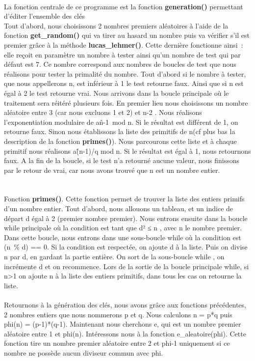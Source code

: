 \documentclass[11pt,fleqn]{book} %
\begin{document}
\paragraph{}La fonction centrale de ce programme est la fonction \textbf{generation()} permettant d'éditer l'ensemble des clés
\\Tout d'abord, nous choisissons 2 nombres premiers aléatoires à l'aide de la fonction \textbf{get\_random()} qui va tirer au hasard un nombre puis va vérifier s'il est premier grâce à la méthode \textbf{lucas\_lehmer()}.
Cette dernière fonctionne ainsi : elle reçoit en paramètre un nombre à tester ainsi qu'un nombre de test qui par défaut est 7. Ce nombre correspond aux nombres de boucles de test que nous réalisons pour tester la primalité du nombre. Tout d'abord si le nombre à tester, que nous appellerons n, est inférieur à 1 le test retourne faux. Ainsi que si n est égal à 2 le test retourne vrai. Nous arrivons dans la boucle principale où le traitement sera réitéré plusieurs fois. En premier lieu nous choisissons un nombre aléatoire entre 3 (car nous excluons 1 et 2) et n-2 . Nous réalisons l’exponentiation modulaire de a\^n-1 mod n. Si le résultat est différent de 1,  on retourne faux. Sinon nous établissons la liste des primitifs de n(cf plus bas la description de la fonction \textbf{primes()}). Nous parcourons cette liste et à chaque primitif nous réalisons a\^(n-1)/q mod n. Si le résultat est égal à 1, nous retournons faux. A la fin de la boucle, si le test n'a retourné aucune valeur, nous finissons par le retour de vrai, car nous avons trouvé que n est un nombre entier.
\\\\\\Fonction \textbf{primes()}. Cette fonction permet de trouver la liste des entiers primifs d'un nombre entier. Tout d'abord, nous allouons un tableau, et un indice de départ d égal à 2 (premier nombre premier). Nous entrons ensuite dans la boucle while principale où la condition est tant que d² ≤ n , avec n le nombre premier. Dans cette boucle, nous entrons dans une sous-boucle while  où la condition est (n \% d) == 0. Si la condition est respectée, on ajoute d à la liste. Puis on divise n par d, en gardant la partie entière. On sort de la sous-boucle while , on incrémente d et on recommence. Lors de la sortie de la boucle principale while, si n>1 on ajoute n à la liste des entiers primitifs, dans tous les cas on retourne la liste.
\\\\Retournons à la génération des clés, nous avons grâce aux fonctions précédentes, 2 nombres entiers que nous nommerons p et q. Nous calculons n = p*q puis phi(n) = (p-1)*(q-1). Maintenant nous cherchons e, qui est un nombre premier aléatoire entre 1 et phi(n). Intéressons nous à la fonction e\_aleatoire(phi). Cette fonction tire un nombre premier aléatoire entre 2 et phi-1 uniquement si ce nombre ne possède aucun diviseur commun avec phi.
\end{document}
